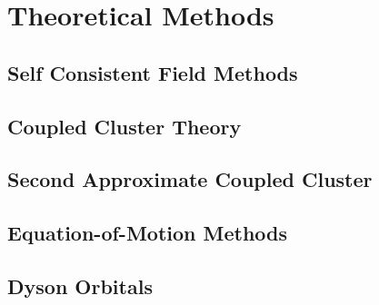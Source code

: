 \chapter{Theoretical Methods}

\section{Self Consistent Field Methods}
\section{Coupled Cluster Theory}
\section{Second Approximate Coupled Cluster}
\section{Equation-of-Motion Methods}
\section{Dyson Orbitals}

\cleardoublepage

